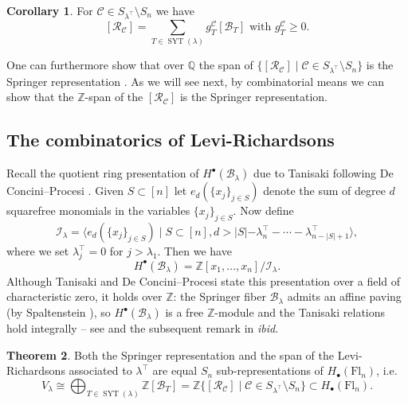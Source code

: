 \documentclass[11pt]{amsart}
\theoremstyle{definition}
\newtheorem{thm}{Theorem}[section]
\newtheorem{cor}[thm]{Corollary}
\numberwithin{equation}{section}
\newcommand{\suchthat}{\;|\;}
\newcommand{\fl}[1]{\mathrm{Fl}_{#1}}
\newcommand{\syt}{\operatorname{SYT}} %
\begin{document}
\begin{cor}
For $\mathcal{C}\in S_{\lambda^{\top}}\setminus S_n$ we have
\begin{equation}
\label{eqn:RCtoBT}[\mathcal{R}_{\mathcal{C}}]=\sum_{T\in \syt(\lambda)} g^{\mathcal{C}}_T [\mathcal{B}_T]\text{ with }g^{\mathcal{C}}_T\ge 0.
\end{equation}
\end{cor}

One can furthermore show that over $\mathbb{Q}$ the span of  $\{[\mathcal{R}_{\mathcal{C}}]\suchthat \mathcal{C}\in S_{\lambda^{\top}}\setminus S_n\}$ is the Springer representation \cite{MarthaPriv}. As we will see next, by combinatorial means we can show that the $\mathbb{Z}$-span of the $[\mathcal{R}_{\mathcal{C}}]$ is the Springer representation.


\subsection{The combinatorics of Levi-Richardsons}
Recall the quotient ring presentation of $H^{\bullet}(\mathcal{B}_{\lambda})$ due to Tanisaki \cite{Tan82} following De Concini--Procesi \cite{DCP81}.
Given $S\subset [n]$ let $e_d(\{x_j\}_{j\in S})$ denote the sum of degree $d$ squarefree monomials in the variables $\{x_j\}_{j\in S}$. Now define
\[
    \mathcal{I}_{\lambda}=\langle e_d(\{x_j\}_{j\in S}) \suchthat S\subset [n], d>|S|-\lambda_n^{\top}-\cdots - \lambda_{n-|S|+1}^{\top} \rangle,
\]
where we set $\lambda_j^{\top}=0$ for $j>\lambda_1$.
Then we have
\[
    H^\bullet(\mathcal{B}_\lambda)=\mathbb{Z}[x_1,\ldots,x_n]/\mathcal{I}_\lambda.
\]
Although Tanisaki \cite{Tan82} and De Concini--Procesi \cite{DCP81} state this presentation over a field of characteristic zero, it holds over $\mathbb{Z}$: the Springer fiber $\mathcal{B}_\lambda$ admits an affine paving (by Spaltenstein \cite{Spa76,Spa77}), so $H^\bullet(\mathcal{B}_\lambda)$ is a free $\mathbb{Z}$-module and the Tanisaki relations hold integrally -- see \cite[Theorem 4.1]{AH16} and the subsequent remark in \textit{ibid}.
\begin{thm}
\label{thm:Zupgrade}
Both the Springer representation and the span of the Levi-Richardsons associated to $\lambda^{\top}$ are equal $S_n$ sub-representations of  $H_\bullet(\fl{n})$, i.e.
$$V_\lambda\cong \bigoplus_{T\in \syt(\lambda)}\mathbb{Z}[\mathcal{B}_T]= \mathbb{Z}\{[\mathcal{R}_{\mathcal{C}}]\suchthat \mathcal{C}\in S_{\lambda^{\top}}\setminus S_n\}\subset H_\bullet(\fl{n}).$$
\end{thm}
\end{document}
